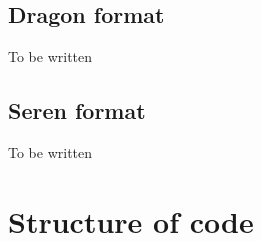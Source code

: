 \documentclass[a4paper]{article}
\begin{document}
\subsection{Dragon format}
To be written



\subsection{Seren format}
To be written




\section{Structure of code}


\end{document}
